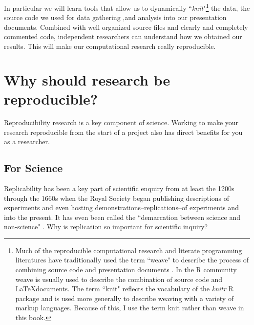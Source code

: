 In particular we will learn tools that allow us to dynamically ``{\emph{knit}}"\footnote{Much of the reproducible computational research and literate programming literatures have traditionally used the term ``weave" to describe the process of combining source code and presentation documents \cite[see][101]{Knuth1992}. In the R community weave is usually used to describe the combination of source code and \LaTeX documents. The term ``knit" reflects the vocabulary of the {\emph{knitr}} R package and is used more generally to describe weaving with a variety of markup languages. Because of this, I use the term knit rather than weave in this book.} the data, the source code we used for data gathering ,and analysis into our presentation documents. Combined with well organized source files and clearly and completely commented code, independent researchers can understand how we obtained our results. This will make our computational research really reproducible.


\section{Why should research be reproducible?}

Reproducibility research is a key component of science. Working to make your research reproducible from the start of a project also has direct benefits for you as a researcher. 

\subsection{For Science}

Replicability has been a key part of scientific enquiry from at least the 1200s \cite[]{Bacon1267,Nosek2012} through the 1660s \cite[2]{Stodden2010} when the Royal Society began publishing descriptions of experiments and even hosting demonstrations--replications--of experiments and into the present. It has even been called the ``demarcation between science and non-science" \cite[2]{Braude1979}. Why is replication so important for scientific inquiry? 

